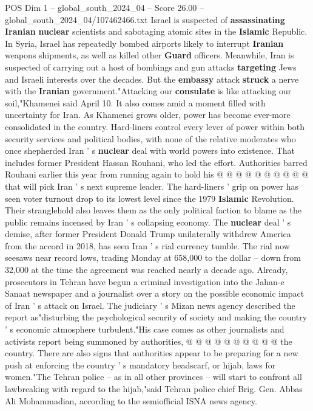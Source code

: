 \begin{textsample}{POS Dim 1 – global\_south\_2024\_04 – Score 26.00 – global\_south\_2024\_04/107462466.txt}
Israel is suspected of \textbf{assassinating} \textbf{Iranian} \textbf{nuclear} scientists and sabotaging atomic sites in the \textbf{Islamic} Republic.
In Syria, Israel has repeatedly bombed airports likely to interrupt \textbf{Iranian} weapons shipments, as well as killed other \textbf{Guard} officers.
Meanwhile, Iran is suspected of carrying out a host of bombings and gun attacks \textbf{targeting} Jews and Israeli interests over the decades.
But the \textbf{embassy} attack \textbf{struck} a nerve with the \textbf{Iranian} government."Attacking our \textbf{consulate} is like attacking our soil,"Khamenei said April 10.
It also comes amid a moment filled with uncertainty for Iran.
As Khamenei grows older, power has become ever-more consolidated in the country.
Hard-liners control every lever of power within both security services and political bodies, with none of the relative moderates who once shepherded Iran ' s \textbf{nuclear} deal with world powers into existence.
That includes former President Hassan Rouhani, who led the effort.
Authorities barred Rouhani earlier this year from running again to hold his @ @ @ @ @ @ @ @ @ @ that will pick Iran ' s next supreme leader.
The hard-liners ' grip on power has seen voter turnout drop to its lowest level since the 1979 \textbf{Islamic} Revolution.
Their stranglehold also leaves them as the only political faction to blame as the public remains incensed by Iran ' s collapsing economy.
The \textbf{nuclear} deal ' s demise, after former President Donald Trump unilaterally withdrew America from the accord in 2018, has seen Iran ' s rial currency tumble.
The rial now seesaws near record lows, trading Monday at 658,000 to the dollar -- down from 32,000 at the time the agreement was reached nearly a decade ago.
Already, prosecutors in Tehran have begun a criminal investigation into the Jahan-e Sanaat newspaper and a journalist over a story on the possible economic impact of Iran ' s attack on Israel.
The judiciary ' s Mizan news agency described the report as"disturbing the psychological security of society and making the country ' s economic atmosphere turbulent."His case comes as other journalists and activists report being summoned by authorities, @ @ @ @ @ @ @ @ @ @ the country.
There are also signs that authorities appear to be preparing for a new push at enforcing the country ' s mandatory headscarf, or hijab, laws for women."The Tehran police -- as in all other provinces -- will start to confront all lawbreaking with regard to the hijab,"said Tehran police chief Brig.
Gen.
Abbas Ali Mohammadian, according to the semiofficial ISNA news agency.

\end{textsample}
